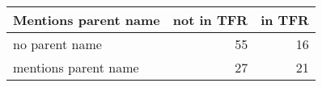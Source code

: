 \begin{tabular}{lrr}
\toprule
Mentions parent name & not in TFR & in TFR \\
\midrule
no parent name & 55 & 16 \\
mentions parent name & 27 & 21 \\
\bottomrule
\end{tabular}
